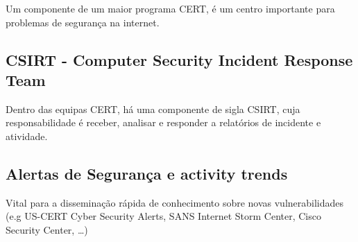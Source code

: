 \documentclass{article}
\begin{document}
Um componente de um maior programa CERT, é um centro importante
para problemas de segurança na internet.

\subsection{CSIRT - Computer Security Incident Response Team}

Dentro das equipas CERT, há uma componente de sigla CSIRT, cuja responsabilidade é
receber, analisar e responder a relatórios de incidente e atividade.

\subsection{Alertas de Segurança e activity trends}

Vital para a disseminação rápida de conhecimento sobre novas vulnerabilidades
(e.g US-CERT Cyber Security Alerts, SANS Internet Storm Center, Cisco Security Center, \dots)
\end{document}
